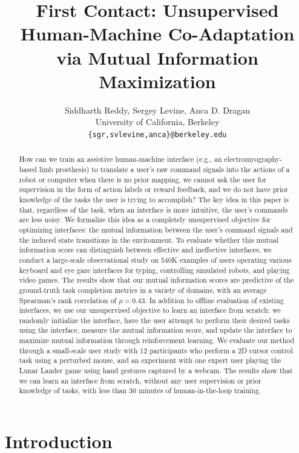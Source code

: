 \documentclass{article}
\title{First Contact: Unsupervised Human-Machine Co-Adaptation via Mutual Information Maximization}
\author{%
  Siddharth Reddy, Sergey Levine, Anca D. Dragan \\
  University of California, Berkeley\\
  \texttt{\{sgr,svlevine,anca\}@berkeley.edu}
}
\begin{document}
\maketitle


\begin{abstract}
How can we train an assistive human-machine interface (e.g., an electromyography-based limb prosthesis) to translate a user's raw command signals into the actions of a robot or computer when there is no prior mapping, we cannot ask the user for supervision in the form of action labels or reward feedback, and we do not have prior knowledge of the tasks the user is trying to accomplish?
The key idea in this paper is that, regardless of the task, when an interface is more intuitive, the user's commands are less noisy.
We formalize this idea as a completely unsupervised objective for optimizing interfaces: the mutual information between the user's command signals and the induced state transitions in the environment.
To evaluate whether this mutual information score can distinguish between effective and ineffective interfaces, we conduct a large-scale observational study on 540K examples of users operating various keyboard and eye gaze interfaces for typing, controlling simulated robots, and playing video games.
The results show that our mutual information scores are predictive of the ground-truth task completion metrics in a variety of domains, with an average Spearman's rank correlation of $\rho = 0.43$.
In addition to offline evaluation of existing interfaces, we use our unsupervised objective to learn an interface from scratch: we randomly initialize the interface, have the user attempt to perform their desired tasks using the interface, measure the mutual information score, and update the interface to maximize mutual information through reinforcement learning.
We evaluate our method through a small-scale user study with 12 participants who perform a 2D cursor control task using a perturbed mouse, and an experiment with one expert user playing the Lunar Lander game using hand gestures captured by a webcam.
The results show that we can learn an interface from scratch, without any user supervision or prior knowledge of tasks, with less than 30 minutes of human-in-the-loop training.
\end{abstract}

\section{Introduction}
\end{document}
